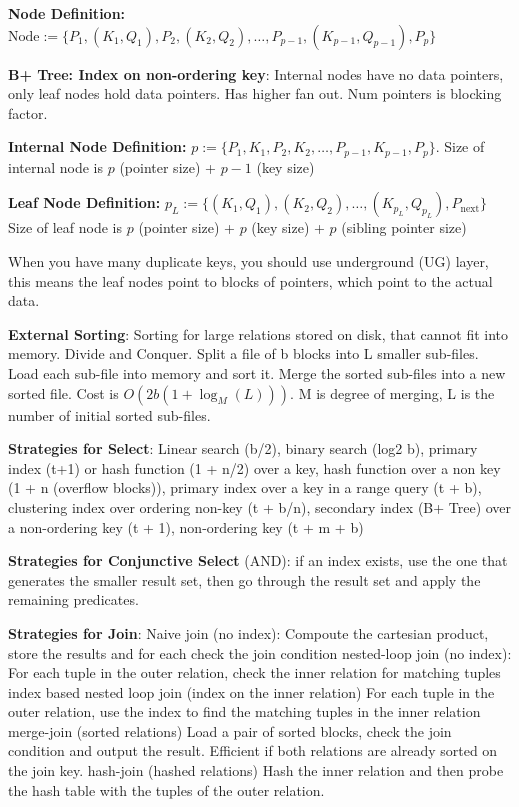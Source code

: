 \documentclass{article}
\begin{document}
\noindent \textbf{Node Definition:} $\text{Node} := \{P_1, (K_1, Q_1), P_2, (K_2, Q_2), \ldots, P_{p-1}, (K_{p-1}, Q_{p-1}), P_p\}$

\noindent \textbf{B+ Tree: Index on non-ordering key}: Internal nodes have no data pointers, only leaf nodes hold data pointers.
Has higher fan out. Num pointers is blocking factor.

\noindent \textbf{Internal Node Definition:} $p := \{P_1, K_1, P_2, K_2, \ldots, P_{p-1}, K_{p-1}, P_p\}$.
Size of internal node is $p$ (pointer size) + $p-1$ (key size)

\noindent \textbf{Leaf Node Definition:} $p_L := \{(K_1, Q_1), (K_2, Q_2), \ldots, (K_{p_L}, Q_{p_L}), P_{\text{next}}\}$
Size of leaf node is $p$ (pointer size) + $p$ (key size) + $p$ (sibling pointer size)

When you have many duplicate keys, you should use underground (UG) layer, this means the leaf nodes point to blocks of pointers,
which point to the actual data.

\noindent \textbf{External Sorting}: Sorting for large relations stored on disk, that cannot fit into memory.
Divide and Conquer. Split a file of b blocks into L smaller sub-files. Load each sub-file into memory and sort it.
Merge the sorted sub-files into a new sorted file. 
Cost is $O(2b(1 + \log_M(L)))$. M is degree of merging, L is the number of initial sorted sub-files.

\noindent \textbf{Strategies for Select}: Linear search (b/2), binary search (log2 b), primary index (t+1) or hash function (1 + n/2) over a key,
hash function over a non key (1 + n (overflow blocks)), primary index over a key in a range query (t + b), clustering index over ordering non-key (t + b/n),
secondary index (B+ Tree) over a non-ordering key (t + 1), non-ordering key (t + m + b)


\noindent \textbf{Strategies for Conjunctive Select} (AND): if an index exists, use the one that generates the smaller result set,
then go through the result set and apply the remaining predicates.

\noindent \textbf{Strategies for Join}: Naive join (no index): Compoute the cartesian product, store the results and for each check the join condition
nested-loop join (no index): For each tuple in the outer relation, check the inner relation for matching tuples
index based nested loop join (index on the inner relation) For each tuple in the outer relation, use the index to find the matching tuples in the inner relation
merge-join (sorted relations) Load a pair of sorted blocks, check the join condition and output the result. Efficient if both relations
are already sorted on the join key.
hash-join (hashed relations) Hash the inner relation and then probe the hash table with the tuples of the outer relation.
\end{document}
